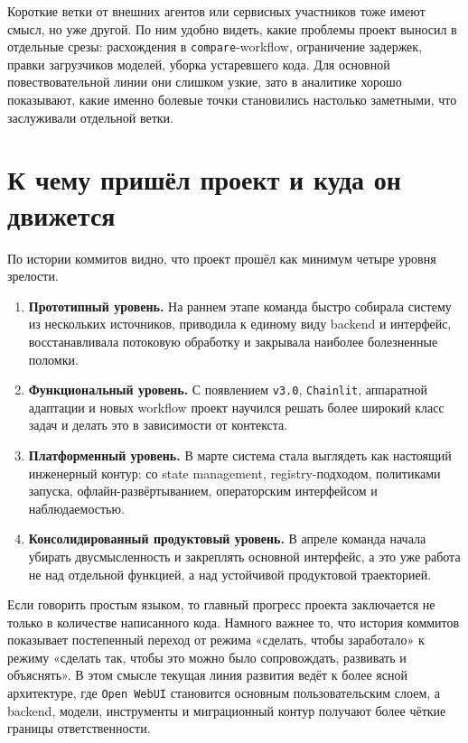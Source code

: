 \documentclass[12pt,a4paper]{article}
\begin{document}
Короткие ветки от внешних агентов или сервисных участников тоже имеют смысл, но уже другой. По ним удобно видеть, какие проблемы проект выносил в отдельные срезы: расхождения в \texttt{compare}-workflow, ограничение задержек, правки загрузчиков моделей, уборка устаревшего кода. Для основной повествовательной линии они слишком узкие, зато в аналитике хорошо показывают, какие именно болевые точки становились настолько заметными, что заслуживали отдельной ветки.

\section{К чему пришёл проект и куда он движется}

По истории коммитов видно, что проект прошёл как минимум четыре уровня зрелости.

\begin{enumerate}
\item \textbf{Прототипный уровень.} На раннем этапе команда быстро собирала систему из нескольких источников, приводила к единому виду backend и интерфейс, восстанавливала потоковую обработку и закрывала наиболее болезненные поломки.
\item \textbf{Функциональный уровень.} С появлением \texttt{v3.0}, \texttt{Chainlit}, аппаратной адаптации и новых workflow проект научился решать более широкий класс задач и делать это в зависимости от контекста.
\item \textbf{Платформенный уровень.} В марте система стала выглядеть как настоящий инженерный контур: со state management, registry-подходом, политиками запуска, офлайн-развёртыванием, операторским интерфейсом и наблюдаемостью.
\item \textbf{Консолидированный продуктовый уровень.} В апреле команда начала убирать двусмысленность и закреплять основной интерфейс, а это уже работа не над отдельной функцией, а над устойчивой продуктовой траекторией.
\end{enumerate}

Если говорить простым языком, то главный прогресс проекта заключается не только в количестве написанного кода. Намного важнее то, что история коммитов показывает постепенный переход от режима «сделать, чтобы заработало» к режиму «сделать так, чтобы это можно было сопровождать, развивать и объяснять». В этом смысле текущая линия развития ведёт к более ясной архитектуре, где \texttt{Open WebUI} становится основным пользовательским слоем, а backend, модели, инструменты и миграционный контур получают более чёткие границы ответственности.
\end{document}

